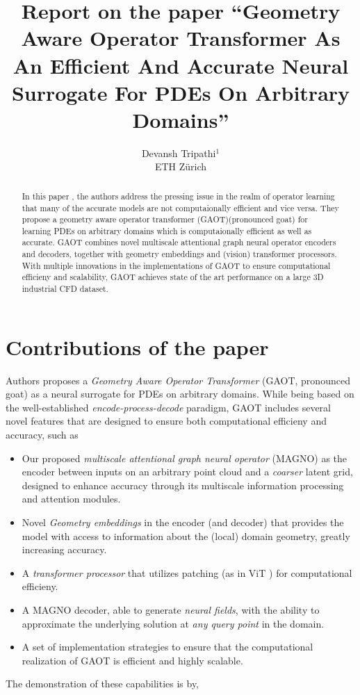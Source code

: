 \documentclass[reqno,10pt]{amsart}
\title{Report on the paper ``Geometry Aware Operator Transformer As An Efficient And Accurate Neural Surrogate For PDEs On Arbitrary Domains''}
\author{Devansh Tripathi$^1$ \\ ETH Z\lowercase{\"urich}}
\theoremstyle{plain}
\theoremstyle{definition}
\begin{document}

\begin{abstract}
    In this paper \cite{SW2025}, the authors address the pressing issue in the realm of operator learning that many of the accurate models are not computaionally efficient and vice versa. They propose a geometry aware operator transformer (GAOT)(pronounced goat) for learning PDEs on arbitrary domains which is computaionally efficient as well as accurate. GAOT combines novel multiscale attentional graph neural operator encoders and decoders, together with geometry embeddings and (vision) transformer processors. With multiple innovations in the implementations of GAOT to ensure computational efficieny and scalability, GAOT achieves state of the art performance on a large 3D industrial CFD dataset. 
\end{abstract}
\maketitle
\section{\bf Contributions of the paper}
Authors proposes a {\it Geometry Aware Operator Transformer} (GAOT, pronounced goat) as a neural surrogate for PDEs on arbitrary domains. While being based on the well-established {\it encode-process-decode} paradigm, GAOT includes several novel features that are designed to ensure both computational efficieny and accuracy, such as

\begin{itemize}\setlength{\itemsep}{0.7em}
    \item Our proposed {\it multiscale attentional graph neural operator} (MAGNO) as the encoder between inputs on an arbitrary point cloud and a {\it coarser} latent grid, designed to enhance accuracy through its multiscale information processing and attention modules.
    \item Novel {\it Geometry embeddings} in the encoder (and decoder) that provides the model with access to information about the (local) domain geometry, greatly increasing accuracy. 
    \item A {\it transformer processor} that utilizes patching (as in ViT \cite{AD2021}) for computational efficieny.
    \item A MAGNO decoder, able to generate {\it neural fields}, with the ability to approximate the underlying solution at {\it any query point} in the domain.
    \item A set of implementation strategies to ensure that the computational realization of GAOT is efficient and highly scalable.
\end{itemize}
The demonstration of these capabilities is by,
\end{document}
